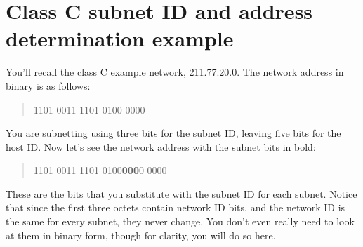 \section{Class C subnet ID and address determination example}

You'll recall the class C example network, 211.77.20.0.
The network address in binary is as follows:
\begin{quote}
1101 0011 1101 0100 0000
\end{quote}

You are subnetting using three bits for the subnet ID, leaving five bits for the host ID.
Now let's see the network address with the subnet bits in bold:

\begin{quote}
1101 0011 1101 0100\quad \textbf{000}0 0000
\end{quote}

These are the bits that you substitute with the subnet ID for each
subnet. Notice that since the first three octets contain network ID
bits, and the network ID is the same for every subnet, they never
change. You don't even really need to look at them in binary form,
though for clarity, you will do so here.

